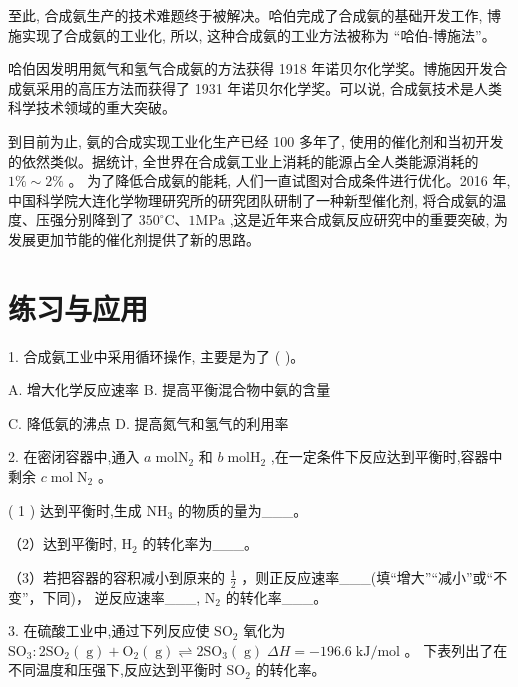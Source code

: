 \documentclass[10pt]{article}
\begin{document}
至此, 合成氨生产的技术难题终于被解决。哈伯完成了合成氨的基础开发工作, 博施实现了合成氨的工业化, 所以, 这种合成氨的工业方法被称为 “哈伯-博施法”。

哈伯因发明用氮气和氢气合成氨的方法获得 1918 年诺贝尔化学奖。博施因开发合成氨采用的高压方法而获得了 1931 年诺贝尔化学奖。可以说, 合成氨技术是人类科学技术领域的重大突破。

到目前为止, 氨的合成实现工业化生产已经 100 多年了, 使用的催化剂和当初开发的依然类似。据统计, 全世界在合成氨工业上消耗的能源占全人类能源消耗的 \(1\% \sim 2\%\) 。 为了降低合成氨的能耗, 人们一直试图对合成条件进行优化。2016 年, 中国科学院大连化学物理研究所的研究团队研制了一种新型催化剂, 将合成氨的温度、压强分别降到了 \({350}^{ \circ }\mathrm{C}\text{、}1\mathrm{{MPa}}\) ,这是近年来合成氨反应研究中的重要突破, 为发展更加节能的催化剂提供了新的思路。

\section*{练习与应用}

1. 合成氨工业中采用循环操作, 主要是为了 ( )。

A. 增大化学反应速率 B. 提高平衡混合物中氨的含量

C. 降低氨的沸点 D. 提高氮气和氢气的利用率

2. 在密闭容器中,通入 \(a\mathrm{\;{mol}}{\mathrm{N}}_{2}\) 和 \(b\mathrm{\;{mol}}{\mathrm{H}}_{2}\) ,在一定条件下反应达到平衡时,容器中剩余 \(c\mathrm{\;{mol}}{\mathrm{\;N}}_{2}\) 。

( 1 ) 达到平衡时,生成 \({\mathrm{{NH}}}_{3}\) 的物质的量为\_\_\_。

（2）达到平衡时, \({\mathrm{H}}_{2}\) 的转化率为\_\_\_。

（3）若把容器的容积减小到原来的 \(\frac{1}{2}\) ，则正反应速率\_\_\_(填“增大”“减小”或“不变”，下同)， 逆反应速率\_\_\_, \({\mathrm{N}}_{2}\) 的转化率\_\_\_。

3. 在硫酸工业中,通过下列反应使 \({\mathrm{{SO}}}_{2}\) 氧化为 \({\mathrm{{SO}}}_{3} : 2{\mathrm{{SO}}}_{2}\left( \mathrm{\;g}\right) + {\mathrm{O}}_{2}\left( \mathrm{\;g}\right) \rightleftharpoons 2{\mathrm{{SO}}}_{3}\left( \mathrm{\;g}\right) \;{\Delta H} = - {196.6}\mathrm{\;{kJ}}/\mathrm{{mol}}\) 。 下表列出了在不同温度和压强下,反应达到平衡时 \({\mathrm{{SO}}}_{2}\) 的转化率。

\begin{center}
\end{center}
\end{document}
